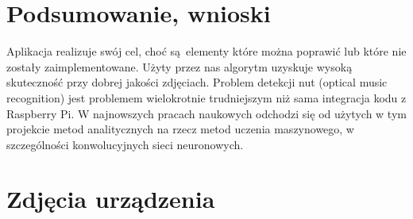 \documentclass[12pt]{article}
\begin{document}
\section{Podsumowanie, wnioski}
Aplikacja realizuje swój cel, choć są elementy które można poprawić lub które nie zostały zaimplementowane. Użyty przez nas algorytm uzyskuje wysoką skuteczność przy dobrej jakości zdjęciach. Problem detekcji nut (optical music recognition) jest problemem wielokrotnie trudniejszym niż sama integracja kodu z Raspberry Pi. W najnowszych pracach naukowych odchodzi się od użytych w tym projekcie metod analitycznych na rzecz metod uczenia maszynowego, w szczególności konwolucyjnych sieci neuronowych.

\clearpage

\section{Zdjęcia urządzenia}
\end{document}
